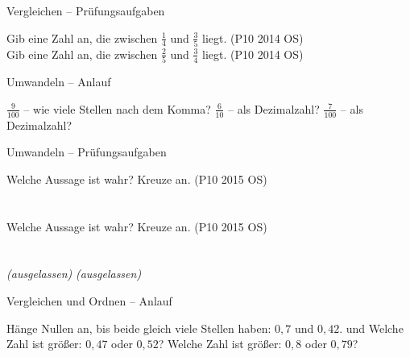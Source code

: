 \begin{aufgabe}{Vergleichen – Prüfungsaufgaben}
\begin{teile}
\teil Gib eine Zahl an, die zwischen $\frac{1}{4}$ und $\frac{3}{5}$ liegt. \hfill (P10 2014 OS) \\ \leerfeld
\teil Gib eine Zahl an, die zwischen $\frac{2}{5}$ und $\frac{3}{4}$ liegt. \hfill (P10 2014 OS) \\ \leerfeld
\end{teile}
\end{aufgabe}

\begin{aufgabe}{Umwandeln – Anlauf}
\begin{teile}
\teil $\frac{9}{100}$ – wie viele Stellen nach dem Komma? \leerfeld
\teil $\frac{6}{10}$ – als Dezimalzahl? \leerfeld
\teil $\frac{7}{100}$ – als Dezimalzahl? \leerfeld
\end{teile}
\end{aufgabe}

\begin{aufgabe}{Umwandeln – Prüfungsaufgaben}
\begin{teile}
\teil Welche Aussage ist wahr? Kreuze an. \hfill (P10 2015 OS)\\ \\ \\ 
\teil Welche Aussage ist wahr? Kreuze an. \hfill (P10 2015 OS)\\ \\ \\ 
\teil \textit{(ausgelassen)}
\teil \textit{(ausgelassen)}
\end{teile}
\end{aufgabe}

\begin{aufgabe}{Vergleichen und Ordnen – Anlauf}
\begin{teile}
\teil Hänge Nullen an, bis beide gleich viele Stellen haben: $0{,}7$ und $0{,}42$. \leerfeld und \leerfeld
\teil Welche Zahl ist größer: $0{,}47$ oder $0{,}52$? \leerfeld
\teil Welche Zahl ist größer: $0{,}8$ oder $0{,}79$? \leerfeld
\end{teile}
\end{aufgabe}

